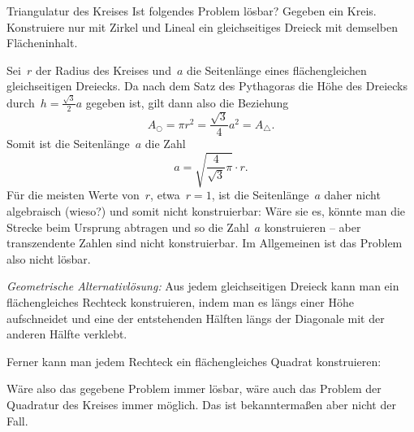 \documentclass{algblatt}
\begin{document}
\begin{aufgabe}{Triangulatur des Kreises}
Ist folgendes Problem lösbar? Gegeben ein Kreis. Konstruiere nur mit Zirkel und
Lineal ein gleichseitiges Dreieck mit demselben Flächeninhalt.

\begin{loesung}
Sei~$r$ der Radius des Kreises und~$a$ die Seitenlänge eines flächengleichen
gleichseitigen Dreiecks. Da nach dem Satz des Pythagoras die Höhe des Dreiecks
durch~$h = \frac{\sqrt{3}}{2} a$ gegeben ist, gilt dann also die Beziehung
\[ A_\bigcirc = \pi r^2 = \frac{\sqrt{3}}{4} a^2 = A_\triangle. \]
Somit ist die Seitenlänge~$a$ die Zahl
\[ a = \sqrt{\frac{4}{\sqrt{3}} \pi} \cdot r. \]
Für die meisten Werte von~$r$, etwa~$r = 1$, ist die Seitenlänge~$a$ daher
nicht algebraisch (wieso?) und somit nicht konstruierbar: Wäre sie es, könnte
man die Strecke beim Ursprung abtragen und so die Zahl~$a$ konstruieren -- aber
transzendente Zahlen sind nicht konstruierbar. Im Allgemeinen ist das Problem
also nicht lösbar.

\emph{Geometrische Alternativlösung:}
Aus jedem gleichseitigen Dreieck kann man ein flächengleiches Rechteck
konstruieren, indem man es längs einer Höhe aufschneidet und eine der
entstehenden Hälften längs der Diagonale mit der anderen Hälfte verklebt.

Ferner kann man jedem Rechteck ein flächengleiches Quadrat konstruieren:
\begin{center}
  \scalebox{0.5}{}
\end{center}

Wäre also das gegebene Problem immer lösbar, wäre auch das Problem der
Quadratur des Kreises immer möglich. Das ist bekanntermaßen aber nicht der
Fall.
\end{loesung}
\end{aufgabe}
\end{document}

